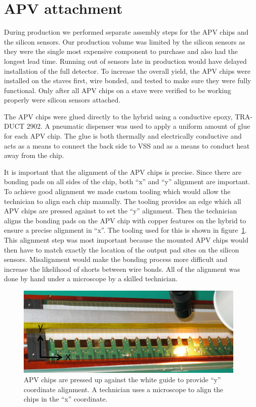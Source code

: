 \documentclass[preprint,12pt]{elsarticle}
\begin{document}
\section{APV attachment}
During production we performed separate assembly steps for the APV chips and the
silicon sensors. Our production volume was limited by the silicon sensors as they were
the single most expensive component to purchase and also had the longest lead
time. Running out of sensors late in production would have delayed installation
of the full detector. To increase the overall yield, the APV chips were
installed on the staves first, wire bonded, and tested to make sure they were
fully functional. Only after all APV chips on a stave were verified to be
working properly were silicon sensors attached.

The APV chips were glued directly to the hybrid using a conductive epoxy, TRA-DUCT
2902. A pneumatic dispenser was used to apply a uniform amount of glue for each
APV chip. The glue is both thermally and electrically conductive and acts as a
means to connect the back side to VSS and as a means to conduct heat away from
the chip.

It is important that the alignment of the APV chips is precise. Since there are
bonding pads on all sides of the chip, both ``x'' and ``y'' alignment are important.
To achieve good alignment we made custom tooling which would allow the
technician to align each chip manually. The tooling provides an edge which all
APV chips are pressed against to set the ``y'' alignment. Then the technician
aligns the bonding pads on the APV chip with copper features on the hybrid to
ensure a precise alignment in ``x''. The tooling used for this is shown in
figure~\ref{fig:apv_attach}. This alignment step was most important
because the mounted APV chips would then have to match exactly the location of
the output pad sites on the silicon sensors. Misalignment would make the bonding
process more difficult and increase the likelihood of shorts between wire bonds.
All of the alignment was done by hand under a microscope by a skilled
technician.

\begin{figure}[h]
\begin{center}
\includegraphics[width=5in, keepaspectratio=true, angle=0]{graphics/apv_attach_tooling.jpg}
\caption{APV chips are pressed up against the white guide to provide ``y'' coordinate
alignment.  A technician uses a microscope to align the chips in the ``x'' coordinate.
\label{fig:apv_attach}}
\end{center}
\end{figure}
%
\end{document}
